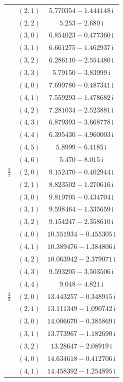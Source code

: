 \begin{table}[H]
\begin{minipage}[t]{0.325\textwidth}
\begin{tabular}[t]{|c|c|c|}
 & $(2,1)$ & $5.770354-1.444148\,\mathrm{i}$ \\
 & $(2,2)$ & $5.253-2.689\,\mathrm{i}$ \\
 & $(3,0)$ & $6.854023-0.477360\,\mathrm{i}$ \\
 & $(3,1)$ & $6.661275-1.462937\,\mathrm{i}$ \\
 & $(3,2)$ & $6.286110-2.554480\,\mathrm{i}$ \\
 & $(3,3)$ & $5.79150-3.83999\,\mathrm{i}$ \\
 & $(4,0)$ & $7.699780-0.487341\,\mathrm{i}$ \\
 & $(4,1)$ & $7.559293-1.478682\,\mathrm{i}$ \\
 & $(4,2)$ & $7.281034-2.523881\,\mathrm{i}$ \\
 & $(4,3)$ & $6.879393-3.668778\,\mathrm{i}$ \\
 & $(4,4)$ & $6.395430-4.960003\,\mathrm{i}$ \\
 & $(4,5)$ & $5.8999-6.4185\,\mathrm{i}$ \\
 & $(4,6)$ & $5.470-8.015\,\mathrm{i}$ \\
\hline
$\tfrac37$ & $(2,0)$ & $9.152470-0.402944\,\mathrm{i}$ \\
 & $(2,1)$ & $8.823502-1.270616\,\mathrm{i}$ \\
 & $(3,0)$ & $9.819705-0.434704\,\mathrm{i}$ \\
 & $(3,1)$ & $9.598464-1.335659\,\mathrm{i}$ \\
 & $(3,2)$ & $9.154247-2.358610\,\mathrm{i}$ \\
 & $(4,0)$ & $10.551934-0.455305\,\mathrm{i}$ \\
 & $(4,1)$ & $10.389476-1.384806\,\mathrm{i}$ \\
 & $(4,2)$ & $10.063942-2.379071\,\mathrm{i}$ \\
 & $(4,3)$ & $9.593205-3.503506\,\mathrm{i}$ \\
 & $(4,4)$ & $9.048-4.821\,\mathrm{i}$ \\
\hline
$\tfrac23$ & $(2,0)$ & $13.443257-0.348915\,\mathrm{i}$ \\
 & $(2,1)$ & $13.111349-1.090742\,\mathrm{i}$ \\
 & $(3,0)$ & $14.006670-0.385869\,\mathrm{i}$ \\
 & $(3,1)$ & $13.773967-1.182690\,\mathrm{i}$ \\
 & $(3,2)$ & $13.28647-2.08919\,\mathrm{i}$ \\
 & $(4,0)$ & $14.634618-0.412706\,\mathrm{i}$ \\
 & $(4,1)$ & $14.458392-1.254895\,\mathrm{i}$ \\

\end{tabular}
\end{minipage}
\end{table}
